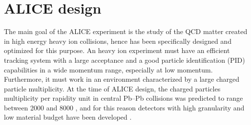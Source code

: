 %
%
\section{ALICE design} \label{sec:3.2}

The main goal of the ALICE experiment is the study of the QCD matter created in high energy heavy
ion collisions, hence has been specifically designed and optimized \cite{alicedesign1,alicedesign2}
for this purpose.
An heavy ion experiment must have an efficient tracking system with a large acceptance and a good
particle identification (PID) capabilities in a wide momentum range, especially at low momentum.
Furthermore, it must work in an environment characterized by a large charged particle multiplicity.
At the time of ALICE design, the charged particles multiplicity per rapidity unit in central Pb–Pb 
collisions was predicted to range between 2000 and 8000 \cite{alicemulti}, and for this reason
detectors with high granularity and low material budget have been developed 
\cite{alicedesign1,alicedesign2}.


